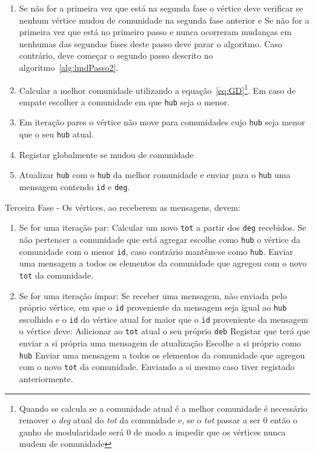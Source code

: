 \begin{enumerate}
\begin{algorithm}
\begin{minipage}{\textwidth}
		\begin{enumerate}
				\item Se não for a primeira vez que está na segunda fase o vértice deve verificar se nenhum vértice mudou de comunidade na segunda fase anterior e
						\subitem Se não for a primeira vez que está no primeiro passo e nunca ocorreram mudanças em nenhumas das segundas fases deste passo deve parar o algoritmo.
						\subitem Caso contrário, deve começar o segundo passo descrito no algoritmo~\ref{alg:lmdPasso2}.
				\item Calcular a melhor comunidade utilizando a equação~\ref{eq:GD}\footnote{Quando se calcula se a comunidade atual é a melhor comunidade é necessário remover o \textit{deg} atual do \textit{tot} da comunidade e, se o \textit{tot} passar a ser 0 então o ganho de modularidade será 0 de modo a impedir que os vértices nunca mudem de comunidade}. 
				Em caso de empate	escolher a comunidade em que \verb|hub| seja o menor.
				\label{prt:force}
				\item Em iteração pares o vértice não move para comunidades cujo \verb|hub| seja menor que o seu \verb|hub| atual.
				\item Registar globalmente se mudou de comunidade
				\item Atualizar \verb|hub| com o \verb|hub| da melhor comunidade e enviar para o \verb|hub| uma mensagem contendo \verb|id| e \verb|deg|.
		\end{enumerate}
			\end{minipage}
\end{algorithm}
\begin{algorithm}
  \item Terceira Fase - Os vértices, ao receberem as mensagens, devem:
\begin{enumerate}
		\item Se for uma iteração par:
				\subitem Calcular um novo \verb|tot| a partir dos \verb|deg| recebidos.
				\label{prt:cycle2}
				\subitem Se não pertencer a comunidade que está agregar escolhe como \verb|hub| o vértice da comunidade com o menor \verb|id|, caso contrário mantêm-se como \verb|hub|.
				\subitem Enviar uma mensagem a todos os elementos da comunidade que agregou com o novo \verb|tot| da comunidade.
		\item Se for uma iteração ímpar:
		\label{prt:cycle1}
		\subitem Se receber uma mensagem, não enviada pelo próprio vértice, em que o \verb|id| proveniente da mensagem seja igual ao \verb|hub| escolhido e o \verb|id| do vértice atual for maior que o \verb|id| proveniente da mensagem o vértice deve:
				\subsubitem Adicionar ao \verb|tot| atual o seu próprio \verb|deb|
				\subsubitem Registar que terá que enviar a si própria uma mensagem de atualização
				\subsubitem Escolhe a si próprio como \verb|hub|
		\subitem Enviar uma mensagem a todos os elementos da comunidade que agregou com o novo \verb|tot| da comunidade. Enviando a si mesmo caso tiver registado anteriormente.
\end{enumerate}
\end{algorithm}
\end{enumerate}



